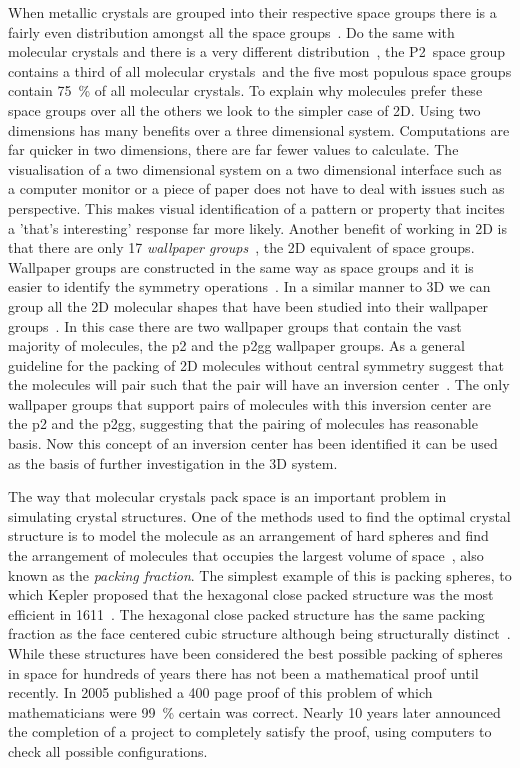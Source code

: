 When metallic crystals are grouped into their respective space groups there is a fairly even distribution amongst all the space groups~\figref{}. Do the same with molecular crystals and there is a very different distribution~\figref{}, the P2~\tocheck space group contains a third of all molecular crystals~\tocite and the five most populous space groups contain \SI{75}{\percent} of all molecular crystals. To explain why molecules prefer these space groups over all the others we look to the simpler case of 2D. Using two dimensions has many benefits over a three dimensional system. Computations are far quicker in two dimensions, there are far fewer values to calculate. The visualisation of a two dimensional system on a two dimensional interface such as a computer monitor or a piece of paper does not have to deal with issues such as perspective. This makes visual identification of a pattern or property that incites a 'that's interesting' response far more likely. Another benefit of working in 2D is that there are only 17 \emph{wallpaper groups}~\figref{}, the 2D equivalent of space groups. Wallpaper groups are constructed in the same way as space groups and it is easier to identify the symmetry operations~\figref{}. In a similar manner to 3D we can group all the 2D molecular shapes that have been studied into their wallpaper groups~\figref{}. In this case there are two wallpaper groups that contain the vast majority of molecules, the p2 and the p2gg wallpaper groups. As a general guideline for the packing of 2D molecules without central symmetry \textcite{toquato:12} suggest that the molecules will pair such that the pair will have an inversion center~\figref{}. The only wallpaper groups that support pairs of molecules with this inversion center are the p2 and the p2gg, suggesting that the pairing of molecules has reasonable basis. Now this concept of an inversion center has been identified it can be used as the basis of further investigation in the 3D system.

The way that molecular crystals pack space is an important problem in simulating crystal structures. One of the methods used to find the optimal crystal structure is to model the molecule as an arrangement of hard spheres and find the arrangement of molecules that occupies the largest volume of space~\cite{kitaigorodskii:73}, also known as the \emph{packing fraction}. The simplest example of this is packing spheres, to which Kepler proposed that the hexagonal close packed structure was the most efficient in 1611~\cite{kepler:1611}. The hexagonal close packed structure has the same packing fraction as the face centered cubic structure although being structurally distinct~\figref{}. While these structures have been considered the best possible packing of spheres in space for hundreds of years there has not been a mathematical proof until recently. In 2005 \textcite{hales:05} published a 400 page proof of this problem of which mathematicians were \SI{99}{\percent} certain was correct. Nearly 10 years later \textcite{hales:14} announced the completion of a project to completely satisfy the proof, using computers to check all possible configurations. 

